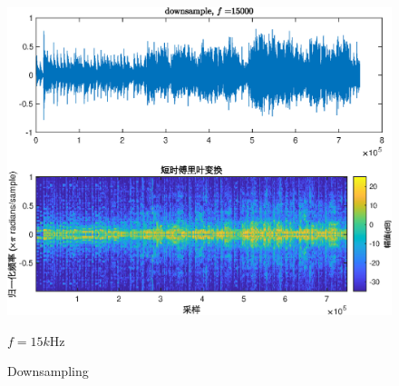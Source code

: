\documentclass[fontset=macnew]{article}
\begin{document}
\begin{figure}[htbp]
\begin{minipage}[b]{0.32\linewidth}
		\includegraphics[width=\linewidth]{downsample_15000.eps}
		\caption*{$f=15k$Hz}
		\label{down15}
	\end{minipage}
	\caption{Downsampling}
	\label{down}
\end{figure}
\end{document}
